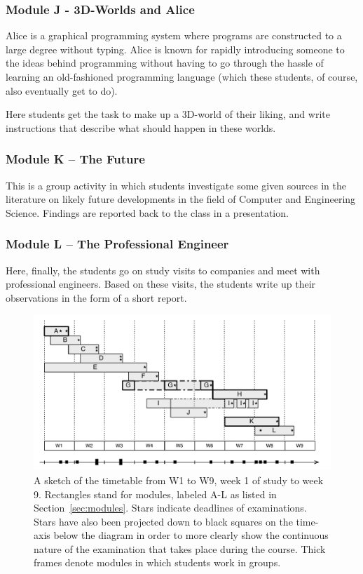 \documentclass[conference]{IEEEtran}
\begin{document}
\subsubsection{Module J - 3D-Worlds and Alice } Alice is a graphical programming system where programs are constructed to a large degree without typing. Alice is known for rapidly introducing someone to the ideas behind programming without having to go through the hassle of learning an old-fashioned programming language (which these students, of course, also eventually get to do).  

Here students get the task to make up a 3D-world of their liking, and write instructions that describe what should happen in these worlds. 

\subsubsection{Module K – The Future} This is a group activity in which students investigate some given sources in the literature on likely future developments in the field of Computer and Engineering Science. Findings are reported back to the class in a presentation. 
 
\subsubsection{Module L – The Professional Engineer} Here, finally, the students go on study visits to companies and meet with professional engineers. Based on these visits, the students write up their observations in the form of a short report. 

\begin{figure}[!t]
  \centering
  \includegraphics[width=\columnwidth]{timetable}
  \caption{A sketch of the timetable from W1 to W9, week 1 of study to week 9. Rectangles stand for modules, labeled A-L as listed in Section~\ref{sec:modules}. Stars indicate deadlines of examinations. Stars have also been projected down to black squares on the time-axis below the diagram in order to more clearly show the continuous nature of the examination that takes place during the course. Thick frames denote modules in which students work in groups.}
  \label{fig:timetable}
\end{figure}
\end{document}
